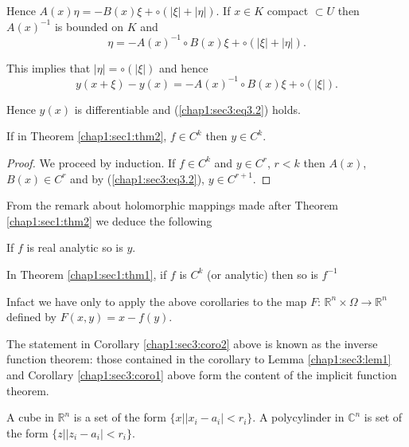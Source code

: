 Hence $A (x) \eta = - B(x) \xi + \circ(|\xi| + | \eta |)$. If $x \in K$
compact $\subset U$ then $A(x)^{-1}$ is bounded on $K$ and  
$$
\eta = - A (x)^{-1} \circ B(x) \xi + \circ(| \xi | + | \eta |).
$$

This implies that $|\eta| =\circ (|\xi|)$ and hence
$$
y(x + {\xi}) - y(x) = - A(x)^{-1} \circ B(x) \xi + \circ (|\xi|).
$$

Hence $y(x)$ is differentiable and (\ref{chap1:sec3:eq3.2}) holds.

\begin{coro*}
If in Theorem \ref{chap1:sec1:thm2}, $f \in C^k$ then $y \in C^k$.
\end{coro*}

\begin{proof}
We proceed by induction. If $f \in C^k$ and $y \in C^r$, $r < k$
then $A(x)$, $B(x) \in C^r$ and by (\ref{chap1:sec3:eq3.2}), $y \in C^{r+1}$. 
\end{proof}

From the remark about holomorphic mappings made after
Theorem \ref{chap1:sec1:thm2} we
deduce the following 

\setcounter{corollary}{0}
\begin{corollary}\label{chap1:sec3:coro1} %
  If $f$ is real analytic so is $y$.
\end{corollary}

\begin{corollary}\label{chap1:sec3:coro2}%
In Theorem \ref{chap1:sec1:thm1}, if $f$ is $C^k$ (or analytic) then so is $f^{-1}$
\end{corollary}

In\pageoriginale fact we have only to apply the above corollaries to the map $F$:
$\mathbb{R}^n \times \Omega \to \mathbb{R}^n$ defined by $F(x, y) = x-
f(y)$. 

The statement in Corollary \ref{chap1:sec3:coro2} above is known as
the inverse function 
theorem: those contained in the corollary to Lemma
\ref{chap1:sec3:lem1} and Corollary \ref{chap1:sec3:coro1} above form
the content of the implicit function theorem.

\begin{defi*}
A cube in $\mathbb{R}^n$ is a set of the form $\{ x \big| |x_i -
a_i| < r_i \}$. A polycylinder in $\mathbb{C}^n$ is set of the form
$\{z \big| |z_i - a_i| < r_i \}$. 
\end{defi*}

